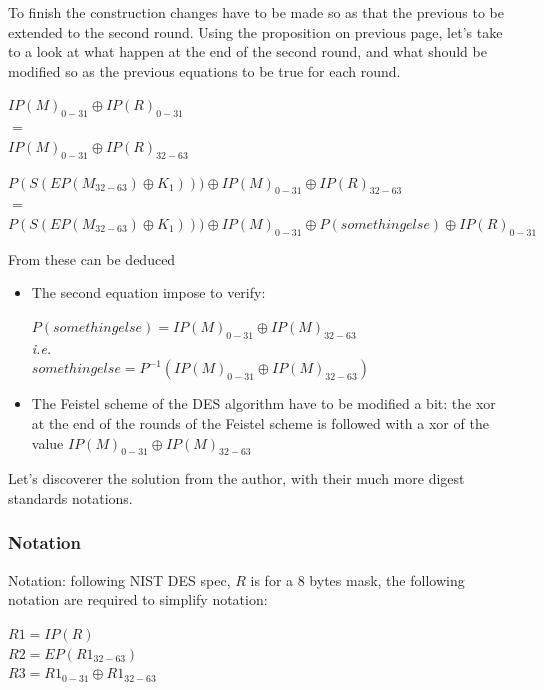 To finish the construction changes have to be made so as that the previous 
to be extended to the second round. 
Using the proposition on previous page, let's take to a look 
at what happen at the end of the second round, and what should be modified so as 
the previous equations to be true for each round.

\begin{center}
	$IP(M)_{0-31} \oplus IP(R)_{0-31}$ \\
	$=$\\
	$IP(M)_{0-31} \oplus IP(R)_{32-63}$
\end{center}
\vspace{3mm}
\begin{center}
	$P(S(EP(M_{32-63}) \oplus K_{1})))\oplus IP(M)_{0-31} \oplus IP(R)_{32-63}$\\
	$=$\\
	$P(S(EP(M_{32-63}) \oplus K_{1}))) \oplus 
	IP(M)_{0-31}\oplus P(somethingelse)	 \oplus IP(R)_{0-31}$
\end{center}


From these can be deduced
\begin{itemize}
	\item The second equation
impose to verify: 
		\begin{center}
			$P(somethingelse) = IP(M)_{0-31} \oplus IP(M)_{32-63}$\\
			\textit{i.e.}\\
			$somethingelse = P^{-1}(IP(M)_{0-31} \oplus IP(M)_{32-63})$
		\end{center}
	\item The Feistel scheme of the DES algorithm have to be modified a bit: the xor
	at the end of the rounds of the Feistel scheme is followed with a xor of the value
	$IP(M)_{0-31} \oplus IP(M)_{32-63}$
\end{itemize}

Let's discoverer the solution from the author, with their much more digest standards notations.

\subsubsection{Notation}
\vspace{2mm}
Notation: following NIST DES spec, $R$ is for a  8 bytes mask, 
the following notation are required to simplify notation:
\begin{center}
$R1 = IP(R)$\\
$R2 = EP(R1_{32-63})$\\
$R3 = R1_{0-31} \oplus R1_{32-63}$
\end{center} 


